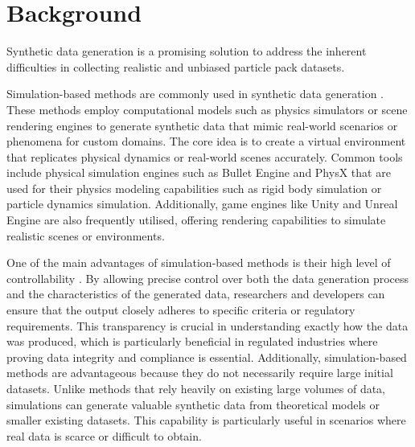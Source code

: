 \documentclass[preprint,12pt]{elsarticle}
\begin{document}
\section{Background}
Synthetic data generation is a promising solution to address the inherent difficulties in collecting realistic and unbiased particle pack datasets.
\par
Simulation-based methods are commonly used in synthetic data generation \citep{demelo2022nextgeneration}.
These methods employ computational models such as physics simulators or scene rendering engines to generate synthetic data that mimic real-world scenarios or phenomena for custom domains. 
The core idea is to create a virtual environment that replicates physical dynamics or real-world scenes accurately.
Common tools include physical simulation engines such as Bullet Engine \citep{coumans2021pybullet} and PhysX \citep{nvidia2024nvidia} that are used for their physics modeling capabilities such as rigid body simulation or particle dynamics simulation. 
Additionally, game engines like Unity \citep{unity2024unity} and Unreal Engine \citep{unreal2024epic} are also frequently utilised, offering rendering capabilities to simulate realistic scenes or environments.
\par
One of the main advantages of simulation-based methods is their high level of controllability \citep{muller2018sim4cv}.
By allowing precise control over both the data generation process and the characteristics of the generated data, researchers and developers can ensure that the output closely adheres to specific criteria or regulatory requirements. 
This transparency is crucial in understanding exactly how the data was produced, which is particularly beneficial in regulated industries where proving data integrity and compliance is essential. 
Additionally, simulation-based methods are advantageous because they do not necessarily require large initial datasets. 
Unlike methods that rely heavily on existing large volumes of data, simulations can generate valuable synthetic data from theoretical models or smaller existing datasets. 
This capability is particularly useful in scenarios where real data is scarce or difficult to obtain.
\end{document}
